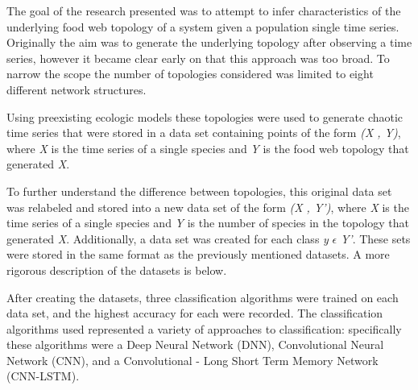 \documentclass[letterpaper, 10 pt, conference]{ieeeconf}  %
\begin{document}
	The goal of the research presented was to attempt to infer characteristics of the underlying food web topology of a system given a population single time series. Originally the aim was to generate the underlying topology after observing a time series, however it became clear early on that this approach was too broad. To narrow the scope the number of topologies considered was limited to eight different network structures. 
    
    Using preexisting ecologic models these topologies were used to generate chaotic time series that were stored in a data set containing points of the form \textit{(X , Y)}, where \textit{X} is the time series of a single species and \textit{Y} is the food web topology that generated \textit{X}.
    
    To further understand the difference between topologies, this original data set was relabeled and stored into a new data set of the form \textit{(X , Y')}, where \textit{X} is the time series of a single species and \textit{Y} is the number of species in the topology that generated \textit{X}. Additionally, a data set was created for each class \textit{y} $\epsilon$ \textit{Y'}. These sets were stored in the same format as the previously mentioned datasets. A more rigorous description of the datasets is below. 
    
    After creating the datasets, three classification algorithms were trained on each data set, and the highest accuracy for each were recorded. The classification algorithms used represented a variety of approaches to classification: specifically these algorithms were a Deep Neural Network (DNN), Convolutional Neural Network (CNN), and a Convolutional - Long Short Term Memory Network (CNN-LSTM). 
    
\end{document}
